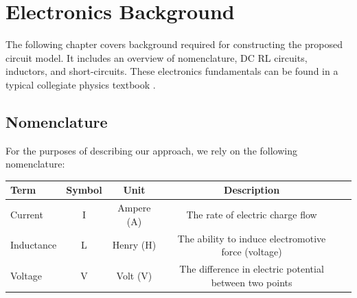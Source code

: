 \documentclass[11pt,oneside]{report}
\begin{document}
    \chapter{Electronics Background}\label{chap:electronics background}
    The following chapter covers background required for constructing the proposed circuit model. It includes an overview of nomenclature, DC RL circuits, inductors, and short-circuits. These electronics fundamentals can be found in a typical collegiate physics textbook \cite{uniphy}.
    
    \section*{Nomenclature}
    For the purposes of describing our approach, we rely on the following nomenclature:
    
    \begin{center}
    \bgroup
    \def\arraystretch{1.0}%
    \begin{tabular}{| l | c | c | c | l |}
      \hline			
      Term & Symbol & Unit & Description\\  \hline \hline \cline{1-4}
      Current & I & Ampere (A) & The rate of electric charge flow \\ \cline{1-4}
      Inductance & L & Henry (H) & The ability to induce electromotive force (voltage)\\ \cline{1-4}
      Voltage & V & Volt (V) & The difference in electric potential between two points\\ \cline{1-4}
      \hline  
    \end{tabular}
    \egroup
    \end{center}
    
    
    
\end{document}
